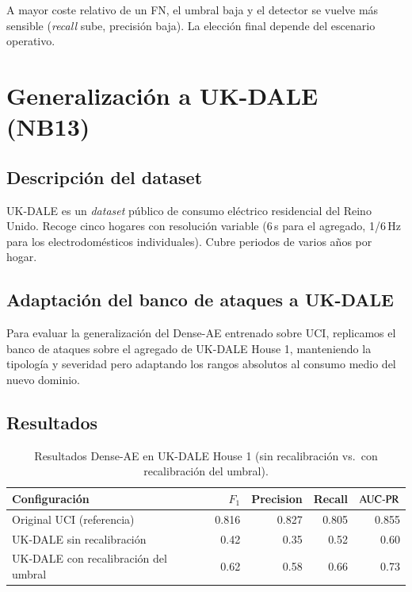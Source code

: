 A mayor coste relativo de un FN, el umbral baja y el detector se vuelve más sensible (\textit{recall} sube, precisión baja). La elección final depende del escenario operativo.

\chapter{Generalización a UK-DALE (NB13)}
\label{anx:ukdale}

\section{Descripción del dataset}

UK-DALE \cite{kelly2015ukdale} es un \textit{dataset} público de consumo eléctrico residencial del Reino Unido. Recoge cinco hogares con resolución variable (6\,s para el agregado, 1/6\,Hz para los electrodomésticos individuales). Cubre periodos de varios años por hogar.

\section{Adaptación del banco de ataques a UK-DALE}

Para evaluar la generalización del Dense-AE entrenado sobre UCI, replicamos el banco de ataques sobre el agregado de UK-DALE House 1, manteniendo la tipología y severidad pero adaptando los rangos absolutos al consumo medio del nuevo dominio.

\section{Resultados}

\begin{table}[H]
\centering
\caption{Resultados Dense-AE en UK-DALE House 1 (sin recalibración vs.\ con recalibración del umbral).}
\label{tab:ukdale}
\small
\begin{tabularx}{\textwidth}{X r r r r}
\toprule
Configuración & $F_1$ & Precision & Recall & $\text{AUC-PR}$ \\
\midrule
Original UCI (referencia)             & 0.816 & 0.827 & 0.805 & 0.855 \\
UK-DALE sin recalibración             & 0.42  & 0.35  & 0.52  & 0.60 \\
UK-DALE con recalibración del umbral  & 0.62  & 0.58  & 0.66  & 0.73 \\
\bottomrule
\end{tabularx}
\end{table}

